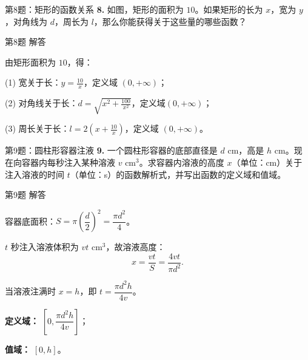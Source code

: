 \documentclass[10pt,aspectratio=169,serif]{beamer}
\begin{document}
\begin{frame}[t]{第8题：矩形的函数关系}
\textbf{8.} 如图，矩形的面积为 $10$。如果矩形的长为 $x$，宽为 $y$，对角线为 $d$，周长为 $l$，那么你能获得关于这些量的哪些函数？

\vspace{2em}
\begin{center}
\end{center}
\end{frame}

\begin{frame}[t]{第8题 解答}
\begin{tcolorbox}[colback=orange!10,colframe=orange,title=\textbf{解}]
由矩形面积为 $10$，得：

\vspace{0.5em}
(1) 宽关于长：$\displaystyle y=\frac{10}{x}$，定义域 $(0,+\infty)$；

\vspace{0.5em}
(2) 对角线关于长：$\displaystyle d=\sqrt{x^2+\frac{100}{x^2}}$，定义域$(0,+\infty)$；

\vspace{0.5em}
(3) 周长关于长：$\displaystyle l=2\left(x+\frac{10}{x}\right)$，定义域 $(0,+\infty)$。
\end{tcolorbox}
\end{frame}

\begin{frame}[t]{第9题：圆柱形容器注液}
\textbf{9.} 一个圆柱形容器的底部直径是 $d$ cm，高是 $h$ cm。现在向容器内每秒注入某种溶液 $v$ cm$^3$。求容器内溶液的高度 $x$（单位：cm）关于注入溶液的时间 $t$（单位：s）的函数解析式，并写出函数的定义域和值域。
\end{frame}

\begin{frame}[t]{第9题 解答}
	\vspace{-2em}
\begin{tcolorbox}[colback=orange!10,colframe=orange,title=\textbf{解}]
容器底面积：$S=\pi\left(\dfrac{d}{2}\right)^2=\dfrac{\pi d^2}{4}$。

\vspace{0.5em}
$t$ 秒注入溶液体积为 $vt$ cm$^3$，故溶液高度：
\[
x=\frac{vt}{S}=\frac{4vt}{\pi d^2}.
\]

\vspace{0.5em}
当溶液注满时 $x=h$，即 $t=\dfrac{\pi d^2 h}{4v}$。

\vspace{0.5em}
\textbf{定义域：} $\left[0,\dfrac{\pi d^2 h}{4v}\right]$；

\vspace{0.3em}
\textbf{值域：} $[0,h]$。
\end{tcolorbox}
\end{frame}
\end{document}
